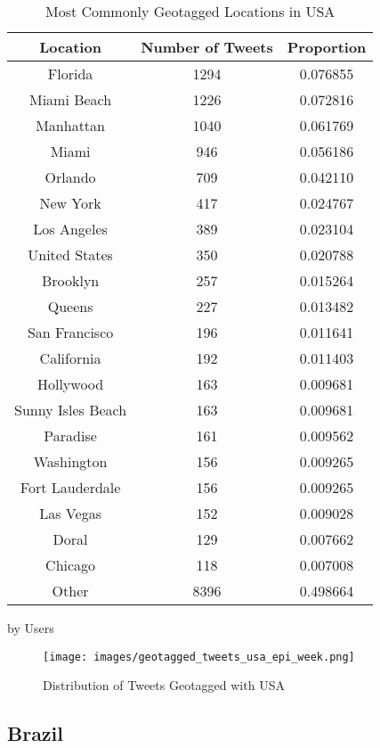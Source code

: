 \begin{table}
\begin{subtable}[c]{0.5\textwidth}
\centering
    \begin{tabular}{|c|c|c|}
    \hline
    Location & Number of Tweets & Proportion \\
    \hline
    Florida & 1294 & 0.076855 \\
    Miami Beach & 1226 & 0.072816 \\
    Manhattan & 1040 & 0.061769 \\
    Miami & 946 & 0.056186 \\
    Orlando & 709 & 0.042110 \\
    New York & 417 & 0.024767 \\
    Los Angeles & 389 & 0.023104 \\
    United States & 350 & 0.020788 \\
    Brooklyn & 257 & 0.015264 \\
    Queens & 227 & 0.013482 \\
    San Francisco & 196 & 0.011641 \\
    California & 192 & 0.011403 \\
    Hollywood & 163 & 0.009681 \\
    Sunny Isles Beach & 163 & 0.009681 \\
    Paradise & 161 & 0.009562 \\
    Washington & 156 & 0.009265 \\
    Fort Lauderdale & 156 & 0.009265 \\
    Las Vegas & 152 & 0.009028 \\
    Doral & 129 & 0.007662 \\
    Chicago & 118 & 0.007008 \\
    Other & 8396 & 0.498664 \\
    \hline
    \end{tabular}
\caption{by Users}
\end{subtable}
\caption{Most Commonly Geotagged Locations in USA}
\label{table:geotagged-usa}
\end{table}



\begin{figure}[H]
    \centering
    \texttt{[image: images/geotagged\_tweets\_usa\_epi\_week.png]}
    
    \caption{Distribution of Tweets Geotagged with USA}
    \label{fig:geotagged-tweets-usa-epi-week}
\end{figure}

\subsection{Brazil}

